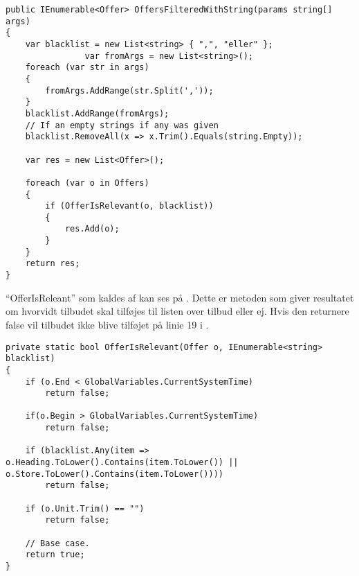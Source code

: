 \begin{lstlisting}[caption="Metoden ``OffersFilteredByUserPrefs'' filtrere tilbud fra som indeholder kommaer\, og ``eller''. Derudover tilføjer det ekstra filtreringer ud fra brugerens opgivede præferencer. Disse sendes som input gennem arrayet af strings. Denne blackliste sendes sammen med hvert offer til metoden ``OfferIsRelevant''\, som tjekker om hvorvidt en vare bør tilføjes til listen af tilbud. Slutteligt returneres resultates som en IEnumerable", label=OffersFilteredByUserPrefs]
public IEnumerable<Offer> OffersFilteredWithString(params string[] args)
{
    var blacklist = new List<string> { ",", "eller" };
                var fromArgs = new List<string>();
    foreach (var str in args)
    {
        fromArgs.AddRange(str.Split(','));
    }
    blacklist.AddRange(fromArgs);
    // If an empty strings if any was given
    blacklist.RemoveAll(x => x.Trim().Equals(string.Empty));

    var res = new List<Offer>();

    foreach (var o in Offers)
    {
        if (OfferIsRelevant(o, blacklist))
        {
            res.Add(o);
        }
    }
    return res;
}
\end{lstlisting}

``OfferIsReleant'' som kaldes af  kan ses på . Dette er metoden som giver resultatet om hvorvidt tilbudet skal tilføjes til listen over tilbud eller ej. Hvis den returnere false vil tilbudet ikke blive tilføjet på linie 19 i .

\begin{lstlisting}[caption="Denne metode kaldet af OffersFilteredByUserPrefs\, sørger for at tilbudet som modtages som input overholder de forskellige krav sat i blacklisten. Der tjekkes også om tilbudet er passende for den nuværende systemtid. Den nuværende systemtid bruges til at ændre tiden i programmet for at loade relevant tilbud\, og bruges udelukkende til fremvisning af funktionalitet og testing. Er resultates true\, tilføjes tilbudet til listen\, hvis resultatet er false tilføjes den ikke.", label=OfferIsRelevant]
private static bool OfferIsRelevant(Offer o, IEnumerable<string> blacklist)
{
    if (o.End < GlobalVariables.CurrentSystemTime)
        return false;

    if(o.Begin > GlobalVariables.CurrentSystemTime)
        return false;

    if (blacklist.Any(item => o.Heading.ToLower().Contains(item.ToLower()) || o.Store.ToLower().Contains(item.ToLower())))
        return false;

    if (o.Unit.Trim() == "")
        return false;

    // Base case.
    return true;
}
\end{lstlisting}


